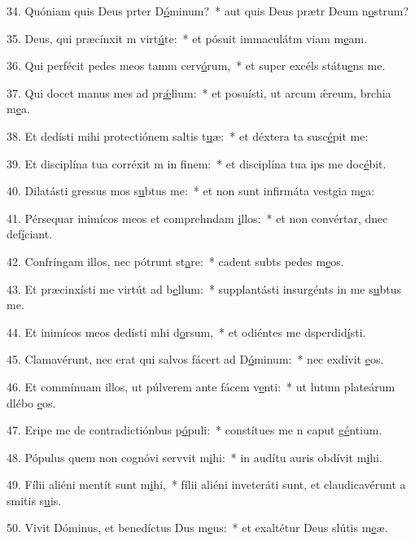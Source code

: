 34. Quóniam quis Deus prter D\uline{ó}minum?~* aut quis Deus prætr Deum n\uline{o}strum?\par 
35. Deus, qui præcínxit m virt\uline{ú}te:~* et pósuit immaculátm viam m\uline{e}am.\par 
36. Qui perfécit pedes meos tamm cerv\uline{ó}rum,~* et super excéls státu\uline{e}ns me.\par 
37. Qui docet manus mes ad pr\uline{ǽ}lium:~* et posuísti, ut arcum ǽreum, brchia m\uline{e}a.\par 
38. Et dedísti mihi protectiónem saltis t\uline{u}æ:~* et déxtera ta susc\uline{é}pit me:\par 
39. Et disciplína tua corréxit m in f\uline{i}nem:~* et disciplína tua ips me doc\uline{é}bit.\par 
40. Dilatásti gressus mos s\uline{u}btus me:~* et non sunt infirmáta vestgia m\uline{e}a:\par 
41. Pérsequar inimícos meos et comprehndam \uline{i}llos:~* et non convértar, dnec def\uline{í}ciant.\par 
42. Confríngam illos, nec pótrunt st\uline{a}re:~* cadent subts pedes m\uline{e}os.\par 
43. Et præcinxísti me virtút ad b\uline{e}llum:~* supplantásti insurgénts in me s\uline{u}btus me.\par 
44. Et inimícos meos dedísti mhi d\uline{o}rsum,~* et odiéntes me dsperdid\uline{í}sti.\par 
45. Clamavérunt, nec erat qui salvos fácert ad D\uline{ó}minum:~* nec exdívit \uline{e}os.\par 
46. Et commínuam illos, ut púlverem ante fácem v\uline{e}nti:~* ut lutum plateárum dlébo \uline{e}os.\par 
47. Eripe me de contradictiónbus p\uline{ó}puli:~* constítues me n caput g\uline{é}ntium.\par 
48. Pópulus quem non cognóvi servvit m\uline{i}hi:~* in audítu auris obdívit m\uline{i}hi.\par 
49. Fílii aliéni mentít sunt m\uline{i}hi,~* fílii aliéni inveteráti sunt, et claudicavérunt a smitis s\uline{u}is.\par 
50. Vivit Dóminus, et benedíctus Dus m\uline{e}us:~* et exaltétur Deus slútis m\uline{e}æ.\par 
